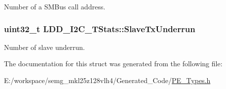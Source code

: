 Number of a S\-M\-Bus call address. \hypertarget{struct_l_d_d___i2_c___t_stats_add2f9914a1ea98c3bf86c0cab84e6a8c}{
\subsubsection[{Slave\-Tx\-Underrun}]{\setlength{\rightskip}{0pt plus 5cm}uint32\-\_\-t L\-D\-D\-\_\-\-I2\-C\-\_\-\-T\-Stats\-::\-Slave\-Tx\-Underrun}}\label{struct_l_d_d___i2_c___t_stats_add2f9914a1ea98c3bf86c0cab84e6a8c}
Number of slave underrun. 

The documentation for this struct was generated from the following file\-:\begin{DoxyCompactItemize}
\item 
E\-:/workspace/semg\-\_\-mkl25z128vlh4/\-Generated\-\_\-\-Code/\hyperlink{_p_e___types_8h}{P\-E\-\_\-\-Types.\-h}\end{DoxyCompactItemize}
